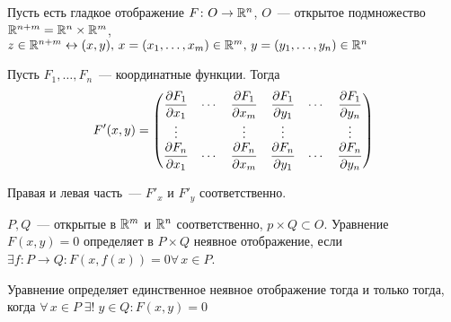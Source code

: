 
Пусть есть гладкое отображение $F\colon O\to \rmy[n]$, $O$~--- открытое подмножество $\rmy[n+m]=\rmy[n]\times\rmy[m]$, $z\in \rmy[n+m] \leftrightarrow (x,y),\,x=(x_1,\ldots,x_m)\in\rmy[m],\,y=(y_1,\ldots,y_n)\in\rmy[n]$

Пусть $F_1,\ldots,F_n$~--- координатные функции. Тогда
\begin{equation*}
    F'(x,y)=
\begin{pmatrix}
    \chast{F_1}{x_1} & \cdots & \chast{F_1}{x_m} & \chast{F_1}{y_1} & \cdots & \chast{F_1}{y_n} \\
    \vdots & & \vdots & \vdots & & \vdots \\
    \chast{F_n}{x_1} & \cdots & \chast{F_n}{x_m} & \chast{F_n}{y_1} & \cdots & \chast{F_n}{y_n}
\end{pmatrix}
\end{equation*}
    
Правая и левая часть~--- $F'_x$ и $F'_y$ соответственно.

\begin{defin*}
    $P, Q$~--- открытые в $\rmy[m]$ и $\rmy[n]$ соответственно, $p\times Q\subset O$. Уравнение $F(x,y)=0$ определяет в $P\times Q$ неявное отображение, если $\exists f\colon P\to Q: F(x,f(x))=0 \forall\,x\in P$.
\end{defin*}
Уравнение определяет единственное неявное отображение тогда и только тогда, когда $\forall\,x\in P\;\exists!\;y\in Q: F(x,y)=0$

